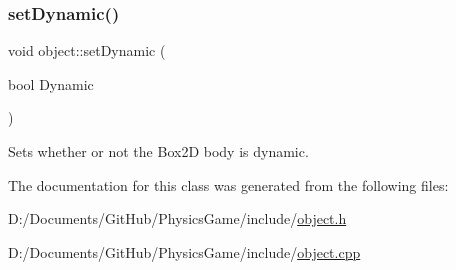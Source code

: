 \subsubsection{\texorpdfstring{set\+Dynamic()}{setDynamic()}}
{\footnotesize\ttfamily void object\+::set\+Dynamic (\begin{DoxyParamCaption}\item[{bool}]{Dynamic }\end{DoxyParamCaption})}



Sets whether or not the Box2D body is dynamic. 



The documentation for this class was generated from the following files\+:\begin{DoxyCompactItemize}
\item 
D\+:/\+Documents/\+Git\+Hub/\+Physics\+Game/include/\hyperlink{object_8h}{object.\+h}\item 
D\+:/\+Documents/\+Git\+Hub/\+Physics\+Game/include/\hyperlink{object_8cpp}{object.\+cpp}\end{DoxyCompactItemize}
